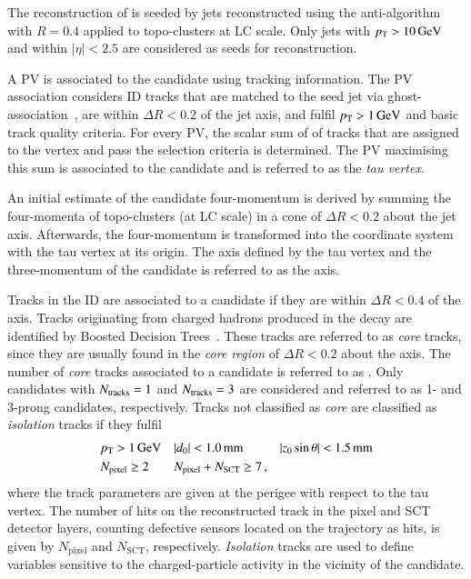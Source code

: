 The reconstruction of \tauhadvis is seeded by jets reconstructed using the
anti-\kt algorithm with $R = 0.4$ applied to topo-clusters at LC scale. Only
jets with $\pT > \SI{10}{\GeV}$ and within $|\eta| < 2.5$ are considered as
seeds for \tauhadvis reconstruction.

A PV is associated to the \tauhadvis candidate using tracking information. The
PV association considers ID tracks that are matched to the seed jet via
ghost-association~\cite{Cacciari:2008gn}, are within $\Delta R < 0.2$ of the jet
axis, and fulfil $\pT > \SI{1}{\GeV}$ and basic track quality criteria. For
every PV, the scalar sum of \pT of tracks that are assigned to the vertex and
pass the selection criteria is determined. The PV maximising this sum is
associated to the \tauhadvis candidate and is referred to as the \emph{tau
  vertex}.

An initial estimate of the \tauhadvis candidate four-momentum is derived by
summing the four-momenta of topo-clusters (at LC scale) in a cone of
$\Delta R < 0.2$ about the jet axis. Afterwards, the four-momentum is
transformed into the coordinate system with the tau vertex at its origin. The
axis defined by the tau vertex and the three-momentum of the \tauhadvis
candidate is referred to as the \tauhadvis axis.

Tracks in the ID are associated to a \tauhadvis candidate if they are within
$\Delta R < 0.4$ of the \tauhadvis axis. Tracks originating from charged hadrons
produced in the \taulepton decay are identified by Boosted Decision
Trees~\cite{duschinger}. These tracks are referred to as \emph{core} tracks,
since they are usually found in the \emph{core region} of $\Delta R < 0.2$ about
the \tauhadvis axis. The number of \emph{core} tracks associated to a \tauhadvis
candidate is referred to as \Ntracks. Only candidates with $N_{\text{tracks}} = 1$ and
$N_{\text{tracks}} = 3$ are considered and referred to as 1- and 3-prong \tauhadvis
candidates, respectively. Tracks not classified as \emph{core} are classified as
\emph{isolation} tracks if they fulfil
\begin{align*}
  & p_{\text{T}} > \SI{1}{\ensuremath{\text{GeV}}} && |d_{0}| < \SI{1.0}{\milli\metre} && |z_{0} \sin\theta| < \SI{1.5}{\milli\metre} \\
  & N_{\text{pixel}} \geq 2 && N_{\text{pixel}} + N_{\text{SCT}} \geq 7 \,\text{,}
\end{align*}
where the track parameters are given at the perigee with respect to the tau
vertex. The number of hits on the reconstructed track in the pixel and SCT
detector layers, counting defective sensors located on the trajectory as hits,
is given by $N_{\text{pixel}}$ and $N_{\text{SCT}}$,
respectively. \emph{Isolation} tracks are used to define variables sensitive to
the charged-particle activity in the vicinity of the \tauhadvis candidate.

